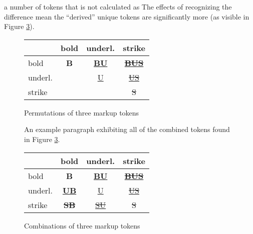 \documentclass{scrreprt}
\begin{document}

 a number of tokens that is not calculated as The effects of recognizing the difference mean the ``derived'' unique tokens are significantly more (as visible in Figure \ref{fig:combinations-of-tokens}).


\begin{figure}[h]
\centering
\begin{tabular}{|l|c|c|c|}
\hline
& bold & underl. & strike

\\ \hline bold &
\textbf{B} &
\textbf{\underline{BU}} &
\textbf{\underline{\sout{BUS}}}


\\ \hline underl. &
&
\underline{U} &
\underline{\sout{US}}


\\ \hline strike &
&
&
\sout{S}

\\ \hline
\end{tabular}
\caption{Permutations of three markup tokens}
\label{fig:permutations-of-tokens}
\end{figure}





\begin{figure}[h]
\centering
{}
\caption{An example paragraph exhibiting all of the combined tokens found in Figure \ref{fig:combinations-of-tokens}.}
\label{fig:mixed-content-paragraph-complex}
\end{figure}





\begin{figure}[h]
\centering
\begin{tabular}{|l|c|c|c|}
\hline
& bold & underl. & strike

\\ \hline bold &
\textbf{B} &
\textbf{\underline{BU}} &
\textbf{\underline{\sout{BUS}}}


\\ \hline underl. &
\underline{\textbf{UB}} &
\underline{U} &
\underline{\sout{US}}


\\ \hline strike &
\sout{\textbf{SB}} &
\sout{\underline{SU}} &
\sout{S}

\\ \hline
\end{tabular}
\caption{Combinations of three markup tokens}
\label{fig:combinations-of-tokens}
\end{figure}
\end{document}
